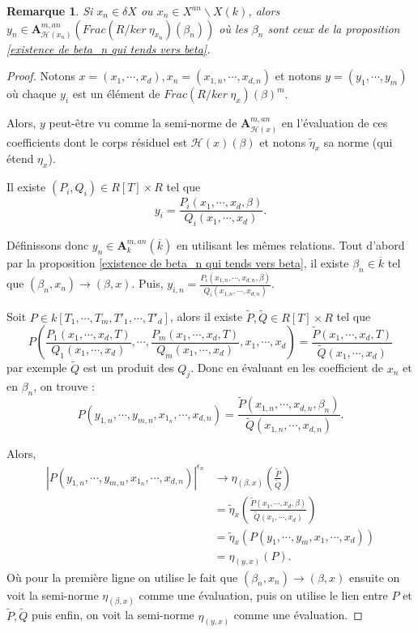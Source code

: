 \documentclass[11pt]{article}
\newcommand{\ana}{\mathbf{A}}
\newtheorem{rem}[thm]{Remarque}
\begin{document}
\begin{rem}
Si $x_n \in \delta X$ ou $x_n \in X^{an}\backslash X(k)$, alors $y_n \in \ana^{m,an}_{ \mathcal{H}(x_n)}(Frac(R/ker~\eta_{x_n})(\beta_n))$ où les $\beta_n$ sont ceux de la proposition \ref{existence de beta_n qui tends vers beta}. 
\end{rem}
\begin{proof}
Notons $x = (x_1, \cdots, x_d), x_n = (x_{1,n}, \cdots, x_{d,n})$ et notons $y = (y_1, \cdots, y_m)$ où chaque $y_i$ est un élément de $Frac(R/ker~\eta_x)(\beta)^m$.

Alors, $y$ peut-être vu comme la semi-norme de $\ana^{m,an}_{\mathcal{H}(x)}$ en l'évaluation de ces coefficients dont le corps résiduel est $\mathcal{H}(x)(\beta)$ et notons $\tilde{\eta}_x$ sa norme (qui étend $\eta_x$).

Il existe $(P_{i}, Q_{i})\in R[T]\times R$ tel que 
\begin{equation*}
y_i = \frac{P_i(x_1, \cdots, x_d, \beta)}{Q_i(x_1, \cdots, x_d)}.
\end{equation*}

Définissons donc $y_n \in \ana^{m, an}_k(\overline{k})$ en utilisant les mêmes relations. Tout d'abord par la proposition \ref{existence de beta_n qui tends vers beta}, il existe $\beta_n \in \overline{k}$ tel que $(\beta_n, x_n) \rightarrow (\beta, x)$. Puis, $y_{i,n} = \frac{P_i(x_{1,n}, \cdots, x_{d,n}, \beta)}{Q_i(x_{1,n}, \cdots, x_{d,n})}$.

Soit $P \in k[T_1, \cdots, T_m, T'_1, \cdots, T'_d]$, alors il existe $\tilde{P}, \tilde{Q} \in R[T]\times R$ tel que 
\begin{equation*}
P(\frac{P_1(x_1, \cdots, x_d, T)}{Q_1(x_1, \cdots, x_d)}, \cdots, \frac{P_m(x_1, \cdots, x_d, T)}{Q_m(x_1, \cdots, x_d)} , x_1, \cdots, x_d)= \frac{\tilde{P}(x_1, \cdots, x_d, T)}{\tilde{Q}(x_1, \cdots, x_d)}
\end{equation*} 
par exemple $\tilde{Q}$ est un produit des $Q_j$. Donc en évaluant en les coefficient de $x_n$ et en $\beta_n$, on trouve :
\begin{equation*}
P(y_{1,n}, \cdots, y_{m,n}, x_{1_n}, \cdots, x_{d,n})= \frac{\tilde{P}(x_{1,n}, \cdots, x_{d,n},\beta_n)}{\tilde{Q}(x_{1,n}, \cdots, x_{d,n})}.
\end{equation*} 

Alors, 
\begin{align*}
|P(y_{1,n}, \cdots, y_{m,n}, x_{1_n}, \cdots, x_{d,n})|^{\epsilon_n} &\rightarrow \eta_{(\beta, x)}(\frac{\tilde{P}}{\tilde{Q}})\\
&= \tilde{\eta}_x(\frac{\tilde{P}(x_1, \cdots, x_d, \beta)}{\tilde{Q}(x_1,\cdots, x_d)})\\
&= \tilde{\eta}_x(P(y_1, \cdots, y_m, x_1, \cdots, x_d))\\
&= \eta_{(y,x)}(P).
\end{align*}
Où pour la première ligne on utilise le fait que $(\beta_n, x_n) \rightarrow (\beta, x)$ ensuite on voit la semi-norme $\eta_{(\beta, x)}$ comme une évaluation, puis on utilise le lien entre $P$ et $\tilde{P}, \tilde{Q}$ puis enfin, on voit la semi-norme $\eta_{(y,x)}$ comme une évaluation.
\end{proof}
\end{document}
